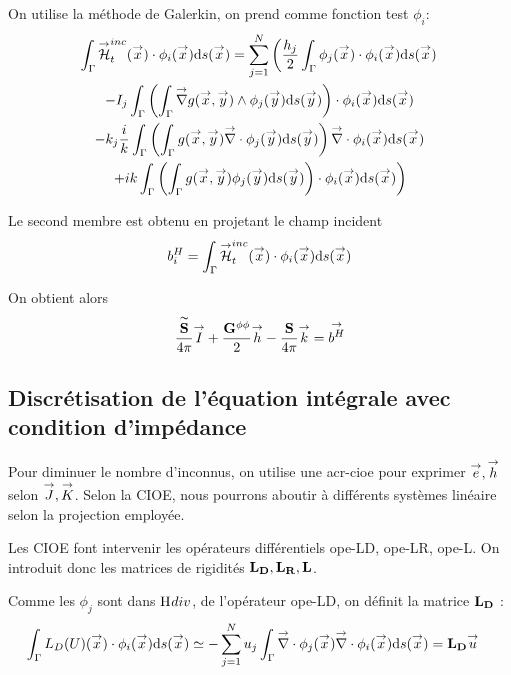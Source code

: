       On utilise la méthode de Galerkin, on prend comme fonction test \(\phi_i\): 
      \begin{multline}
        \int_\Gamma \vH^{inc}_t(\vx) \cdot \phi_i(\vx) \dd{s}(\vx) = \sum_{j=1}^{N} \left(
          \frac{h_j}{2}\int_\Gamma \phi_j(\vx) \cdot \phi_i(\vx) \dd{s}(\vx) \right. \\
          -  I_j\int_\Gamma  \left(\int_\Gamma \vgrad g(\vx,\vy) \pvect \phi_j(\vy) \dd{s}(\vy) \right) \cdot \phi_i(\vx) \dd{s}(\vx) \\
          - k_j\frac{i}{k} \int_\Gamma \left(\int_\Gamma g(\vx,\vy)\vdiv \phi_j(\vy) \dd{s}(\vy) \right) \vdiv \phi_i(\vx) \dd{s}(\vx) \\
        \left.
          + ik\int_\Gamma \left(\int_\Gamma g(\vx,\vy)\phi_j(\vy)\dd{s}{(\vy)}\right)\cdot \phi_i(\vx)\dd{s}(\vx)
        \right)
      \end{multline}

      Le second membre est obtenu en projetant le champ incident 
      \begin{equation}
        b_i^H = \int_\Gamma \vH^{inc}_t(\vx) \cdot \phi_i(\vx)\dd{s}(\vx)
      \end{equation}

      On obtient alors 
      \begin{equation}
        \frac{\mSt}{4\pi}\vect{I} 
        + \frac{\mG{\phi}{\phi}}{2}\vect{h}
        - \frac{\mS}{4\pi}\vect{k} 
        = \vect{b^H}
      \end{equation}

  \subsection{Discrétisation de l'équation intégrale avec condition d'impédance}
    Pour diminuer le nombre d'inconnus, on utilise une \gls{acr-cioe} pour exprimer \(\vect{e}, \vect{h}\) selon \(\vect{J}, \vect{K}\). Selon la CIOE, nous pourrons aboutir à différents systèmes linéaire selon la projection employée. 

    Les CIOE font intervenir les opérateurs différentiels \gls{ope-LD}, \gls{ope-LR}, \gls{ope-L}. On introduit donc les matrices de rigidités \(\mLD,\mLR,\mL\).

    Comme les \(\phi_j\) sont dans \(\Hdiv\), de l'opérateur \gls{ope-LD}, on définit la matrice \(\mLD\) :
    \begin{align}
      \int_\Gamma L_D(U)(\vx) \cdot \phi_i(\vx) \dd{s}(\vx)  
        & \simeq - \sum_{j=1}^N u_j \int_\Gamma \vdiv \phi_j(\vx) \vdiv \phi_i(\vx) \dd{s}(\vx) = \mLD \vu
    \end{align}

